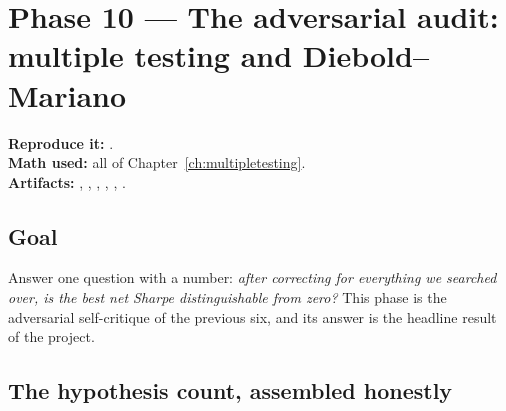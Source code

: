 \section{Phase 10 --- The adversarial audit: multiple testing and Diebold--Mariano}
\label{ch:phase10}

\textbf{Reproduce it:} .\\
\textbf{Math used:} all of Chapter~\ref{ch:multipletesting}.\\
\textbf{Artifacts:} ,
,
,
,
, .

\subsection{Goal}

Answer one question with a number: \emph{after correcting for everything we searched over,
is the best net Sharpe distinguishable from zero?} This phase is the adversarial
self-critique of the previous six, and its answer is the headline result of the project.

\subsection{The hypothesis count, assembled honestly}

